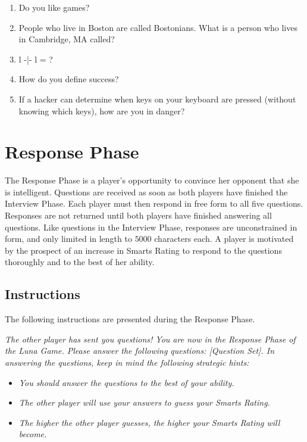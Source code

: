 \begin{enumerate}
\item Do you like games?
\item People who live in Boston are called Bostonians. What is a person who lives in Cambridge, MA called?
\item l -|- l = ?
\item How do you define success?
\item If a hacker can determine when keys on your keyboard are pressed (without knowing which keys), how are you in danger?
\end{enumerate}

\section{Response Phase}

The Response Phase is a player's opportunity to convince her opponent that she is intelligent. Questions are received as soon as both players have finished the Interview Phase. Each player must then respond in free form to all five questions. Responses are not returned until both players have finished answering all questions. Like questions in the Interview Phase, responses are unconstrained in form, and only limited in length to $5000$ characters each. A player is motivated by the prospect of an increase in Smarts Rating to respond to the questions thoroughly and to the best of her ability.

\subsection{Instructions}

The following instructions are presented during the Response Phase.
\begin{center}
\textit{The other player has sent you questions! You are now in the Response Phase of the Luna Game. Please answer the following questions: [Question Set]. In answering the questions, keep in mind the following strategic hints:}
\begin{itemize}
\item \textit{You should answer the questions to the best of your ability.}
\item \textit{The other player will use your answers to guess your Smarts Rating.}
\item \textit{The higher the other player guesses, the higher your Smarts Rating will become.}
\end{itemize}
\end{center}

